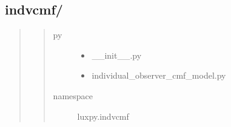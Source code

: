 \documentclass[letterpaper,10pt,english]{sphinxmanual}
\begin{document}
\subsection{indvcmf/}
\label{\detokenize{toolboxes:indvcmf}}\begin{quote}
\begin{quote}\begin{description}
\item[{py}] \leavevmode\begin{itemize}
\item {} 
\_\_init\_\_.py

\item {} 
individual\_observer\_cmf\_model.py

\end{itemize}

\item[{namespace}] \leavevmode
luxpy.indvcmf

\end{description}\end{quote}
\end{quote}
\label{\detokenize{toolboxes:module-luxpy.toolboxes.indvcmf}}
\end{document}
